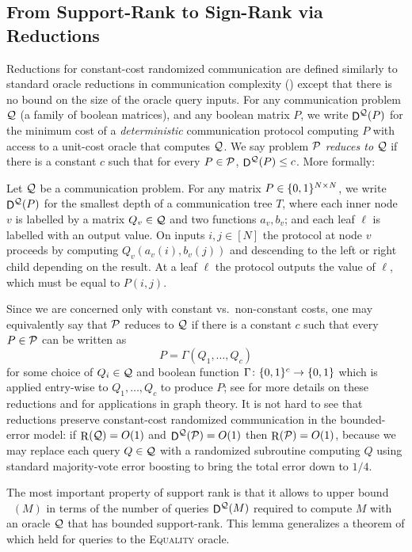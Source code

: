 \documentclass{article}
\DeclareMathOperator{\signrank}{rank_\pm}
\DeclareMathOperator{\Rand}{R}
\DeclareMathOperator{\D}{\mathsf{D}}
\begin{document}
\subsection{From Support-Rank to Sign-Rank via Reductions} \label{sec:reductions}

Reductions for constant-cost randomized communication are defined similarly to standard oracle
reductions in communication complexity (\eg \cite{BFS86,CLV19}) except that there is no bound on the
size of the oracle query inputs. For any communication problem $\mathcal{Q}$ (\ie a family of boolean
matrices), and any boolean matrix $P$,  we write $\D^\cQ(P)$ for the minimum cost of a
\emph{deterministic} communication protocol computing $P$ with access to a unit-cost oracle that
computes $\mathcal{Q}$. We say problem $\mathcal{P}$ \emph{reduces to} $\mathcal{Q}$ if there is a constant $c$ such that
for every $P \in \mathcal{P}$, $\D^\cQ(P) \leq c$. More formally:

\begin{definition}
Let $\mathcal{Q}$ be a communication problem. For any matrix $P \in \{0,1\}^{N \times N}$, we write
$\D^\cQ(P)$ for the smallest depth of a communication tree $T$, where each inner
node $v$ is labelled by a matrix $Q_v \in \mathcal{Q}$ and two functions $a_v,b_v$; and
each leaf $\ell$ is labelled with an output value. On inputs $i,j \in [N]$ the
protocol at node $v$ proceeds by computing $Q_v(a_v(i),b_v(j))$ and descending
to the left or right child depending on the result. At a leaf $\ell$ the
protocol outputs the value of $\ell$, which must be equal to $P(i,j)$.
\end{definition}
Since we are concerned only with constant vs.\ non-constant costs, one may equivalently say that $
\mathcal{P}$ reduces to $\mathcal{Q}$ if there is a constant $c$ such that every $P \in \mathcal{P}$ can be written as
\[
    P = \Gamma(Q_1, \dotsc, Q_c)
\]
for some choice of $Q_i \in \mathcal{Q}$ and boolean function $\Gamma \colon \{0,1\}^c \to
\{0,1\}$ which is applied entry-wise to $Q_1, \dotsc, Q_c$ to produce $P$; see \eg
\cite{CLV19,FHHH24,FGHH25} for more details on these reductions and
\cite{ABSZ24} for applications in graph theory. It is not hard to see that
reductions preserve constant-cost randomized communication in the bounded-error
model: if $\Rand(\cQ) = O(1)$ and $\D^\cQ(\cP) = O(1)$ then $\Rand(\cP) = O(1)$,
because we may replace each query $Q \in \mathcal{Q}$ with a randomized subroutine
computing $Q$ using standard majority-vote error boosting to bring the total
error down to $1/4$.

The most important property of support rank is that it allows to upper bound $\signrank(M)$ in terms
of the number of queries $\D^\cQ(M)$ required to compute $M$ with an oracle $\mathcal{Q}$ that has bounded
support-rank. This lemma generalizes a theorem of \cite{HHPTZ22} which held for queries to the
\textsc{Equality} oracle.
\end{document}
